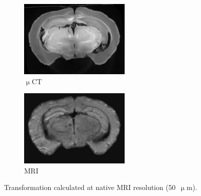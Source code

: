 \documentclass[11pt]{article}
\begin{document}
\begin{figure}[h]
  \centering
  \begin{subfigure}[b]{0.3\textwidth}
    \centering
    \includegraphics[width=\linewidth]{figs/reg_50umWarped_185}
    \caption{$\upmu$CT}
  \end{subfigure}
  \begin{subfigure}[b]{0.3\textwidth}
    \centering
    \includegraphics[width=\linewidth]{figs/mri_50um_185}
    \caption{MRI}
  \end{subfigure}
  \hspace{1em}
  \caption{Transformation calculated at native MRI resolution (50~$\upmu$m).}
  \label{fig:50um}
\end{figure}
\end{document}
